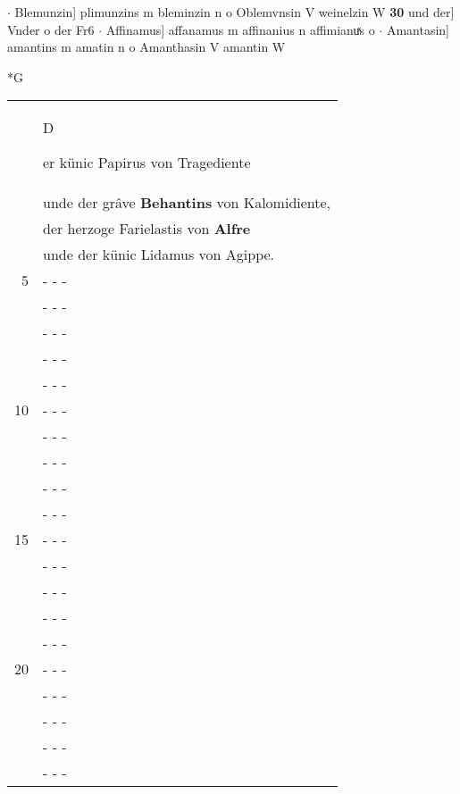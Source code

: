 \documentclass[8pt,a4paper,notitlepage]{article}
\begin{document}
\begin{table}[ht]
\begin{minipage}[t]{0.5\linewidth}
$\cdot$ Blemunzin] plimunzins m bleminzin n o Oblemvnsin V weinelzin W \textbf{30} und der] Vnder o der Fr6  $\cdot$ Affinamus] affanamus m affinanius n affimianuͯs o  $\cdot$ Amantasin] amantins m amatin n o Amanthasin V amantin W \newline
\end{minipage}
\end{table}
\newpage
\begin{table}[ht]
\begin{minipage}[t]{0.5\linewidth}
\small
\begin{center}*G
\end{center}
\begin{tabular}{rl}
 & \begin{large}D\end{large}er künic Papirus von Tragediente\\ 
 & unde der grâve \textbf{Behantins} von Kalomidiente,\\ 
 & der herzoge Farielastis von \textbf{Alfre}\\ 
 & unde der künic Lidamus von Agippe.\\ 
5 & \multicolumn{1}{l}{ - - - }\\ 
 & \multicolumn{1}{l}{ - - - }\\ 
 & \multicolumn{1}{l}{ - - - }\\ 
 & \multicolumn{1}{l}{ - - - }\\ 
 & \multicolumn{1}{l}{ - - - }\\ 
10 & \multicolumn{1}{l}{ - - - }\\ 
 & \multicolumn{1}{l}{ - - - }\\ 
 & \multicolumn{1}{l}{ - - - }\\ 
 & \multicolumn{1}{l}{ - - - }\\ 
 & \multicolumn{1}{l}{ - - - }\\ 
15 & \multicolumn{1}{l}{ - - - }\\ 
 & \multicolumn{1}{l}{ - - - }\\ 
 & \multicolumn{1}{l}{ - - - }\\ 
 & \multicolumn{1}{l}{ - - - }\\ 
 & \multicolumn{1}{l}{ - - - }\\ 
20 & \multicolumn{1}{l}{ - - - }\\ 
 & \multicolumn{1}{l}{ - - - }\\ 
 & \multicolumn{1}{l}{ - - - }\\ 
 & \multicolumn{1}{l}{ - - - }\\ 
 & \multicolumn{1}{l}{ - - - }\\ 

\end{tabular}
\end{minipage}
\end{table}
\end{document}
